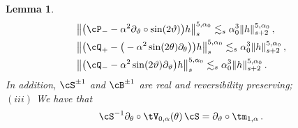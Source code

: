 \documentclass[a4paper,reqno,10pt]{article}
\newtheorem{lem}{Lemma}[section]
\newcommand{\pa}{\partial}
\begin{document}
\begin{lem}
\begin{align}
	& 	\big\| \big( \cP_{-} -\alpha^2 \pa_{\vartheta}\circ \sin(2\vartheta) \big)h \big\|_{s}^{5,\alpha_{0}}  \lesssim_{s} \alpha_{0}^3 \| h \|_{s+2}^{5,\alpha_{0}} \,, \label{invS.expand.est} \\
    & 	\big\| \big(\cQ_{+} -\big( -\alpha^2\sin(2\theta)\pa_{\theta} \big) \big)h \big\|_{s}^{5,\alpha_{0}}  \lesssim_{s} \alpha_{0}^3 \| h \|_{s+2}^{5,\alpha_{0}} \,, \label{B.expand.est}  \\
	& 	\big\| \big( \cQ_{-} -\alpha^2 \sin(2\vartheta)\pa_{\vartheta} \big)h \big\|_{s}^{5,\alpha_{0}}  \lesssim_{s} \alpha_{0}^3 \| h \|_{s+2}^{5,\alpha_{0}} \,. \label{invB.expand.est}
\end{align}
	In addition, $\cS^{\pm 1}$ and $\cB^{\pm 1}$ are real and  reversibility preserving;
	\\[1mm]
	\noindent $(iii)$ We have that
	\begin{equation}
		\cS^{-1} \pa_{\theta}\circ \tV_{0,\alpha}(\theta) \,\cS = \pa_{\vartheta}\circ \tm_{1,\alpha} \,.
	\end{equation}
\end{lem}
\end{document}

